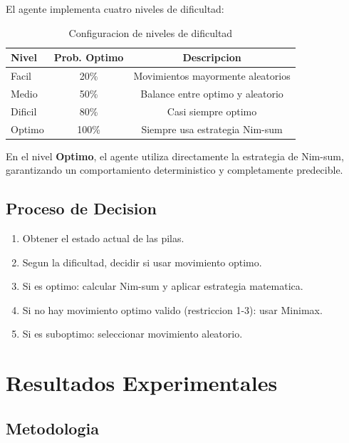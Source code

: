 \documentclass[12pt,a4paper]{article}
\theoremstyle{definition}
\begin{document}
El agente implementa cuatro niveles de dificultad:

\begin{table}[H]
\centering
\caption{Configuracion de niveles de dificultad}
\begin{tabular}{lcc}
\toprule
\textbf{Nivel} & \textbf{Prob. Optimo} & \textbf{Descripcion} \\
\midrule
Facil & 20\% & Movimientos mayormente aleatorios \\
Medio & 50\% & Balance entre optimo y aleatorio \\
Dificil & 80\% & Casi siempre optimo \\
Optimo & 100\% & Siempre usa estrategia Nim-sum \\
\bottomrule
\end{tabular}
\end{table}

En el nivel \textbf{Optimo}, el agente utiliza directamente la estrategia de Nim-sum, garantizando un comportamiento deterministico y completamente predecible.

\subsection{Proceso de Decision}

\begin{enumerate}
    \item Obtener el estado actual de las pilas.
    \item Segun la dificultad, decidir si usar movimiento optimo.
    \item Si es optimo: calcular Nim-sum y aplicar estrategia matematica.
    \item Si no hay movimiento optimo valido (restriccion 1-3): usar Minimax.
    \item Si es suboptimo: seleccionar movimiento aleatorio.
\end{enumerate}

\section{Resultados Experimentales}

\subsection{Metodologia}
\end{document}
